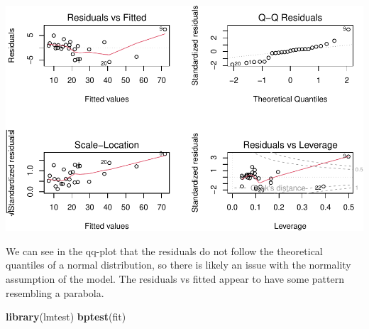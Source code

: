 \documentclass[
  11pt,
]{article}
\newenvironment{Shaded}{\begin{snugshade}}{\end{snugshade}}
\newcommand{\AttributeTok}[1]{\textcolor[rgb]{0.13,0.29,0.53}{#1}}
\newcommand{\ConstantTok}[1]{\textcolor[rgb]{0.56,0.35,0.01}{#1}}
\newcommand{\DecValTok}[1]{\textcolor[rgb]{0.00,0.00,0.81}{#1}}
\newcommand{\FunctionTok}[1]{\textcolor[rgb]{0.13,0.29,0.53}{\textbf{#1}}}
\newcommand{\NormalTok}[1]{#1}
\newcommand{\OtherTok}[1]{\textcolor[rgb]{0.56,0.35,0.01}{#1}}
\newcommand{\SpecialCharTok}[1]{\textcolor[rgb]{0.81,0.36,0.00}{\textbf{#1}}}
\newcommand{\StringTok}[1]{\textcolor[rgb]{0.31,0.60,0.02}{#1}}
\begin{document}
\begin{Shaded}
\end{Shaded}

\includegraphics{examples_files/figure-latex/unnamed-chunk-27-1.pdf}

We can see in the qq-plot that the residuals do not follow the
theoretical quantiles of a normal distribution, so there is likely an
issue with the normality assumption of the model. The residuals vs
fitted appear to have some pattern resembling a parabola.

\begin{Shaded}
\begin{Highlighting}[]
\FunctionTok{library}\NormalTok{(lmtest)}
\FunctionTok{bptest}\NormalTok{(fit)}
\end{Highlighting}
\end{Shaded}
\end{document}
